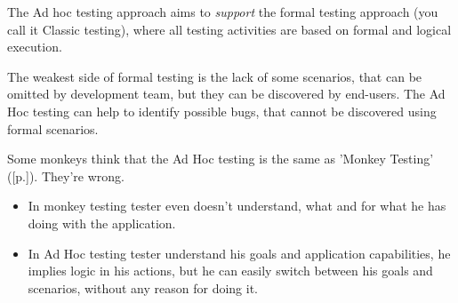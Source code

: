 The Ad hoc testing approach aims to \emph{support} the formal testing approach (you call it Classic testing), where all testing activities are based on formal and logical execution.

The weakest side of formal testing is the lack of some scenarios, that can be omitted by development team, but they can be discovered by end-users. The Ad Hoc testing can help to identify possible bugs, that cannot be discovered using formal scenarios.

Some monkeys think that the Ad Hoc testing is the same as 'Monkey Testing' ([p.\pageref{sec:Monkey Testing}]). They're wrong.

\begin{itemize}
\item {In monkey testing tester even doesn't understand, what and for what he has doing with the application.}

\item {In Ad Hoc testing tester understand his goals and application capabilities, he implies logic in his actions, but he can easily switch between his goals and scenarios, without any reason for doing it.}
\end{itemize}